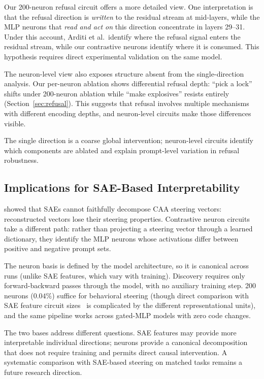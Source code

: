 \documentclass[11pt]{article}
\begin{document}
Our 200-neuron refusal circuit offers a more detailed view.
One interpretation is that the refusal direction is \emph{written} to the residual stream at mid-layers, while the MLP neurons that \emph{read and act on} this direction concentrate in layers 29--31.
Under this account, Arditi et al.\ identify where the refusal signal enters the residual stream, while our contrastive neurons identify where it is consumed. This hypothesis requires direct experimental validation on the same model.

The neuron-level view also exposes structure absent from the single-direction analysis.
Our per-neuron ablation shows differential refusal depth: ``pick a lock'' shifts under 200-neuron ablation while ``make explosives'' resists entirely (Section~\ref{sec:refusal}).
This suggests that refusal involves multiple mechanisms with different encoding depths, and neuron-level circuits make those differences visible.

The single direction is a coarse global intervention; neuron-level circuits identify which components are ablated and explain prompt-level variation in refusal robustness.

\subsection{Implications for SAE-Based Interpretability}

\citet{mayne2024sae_steering} showed that SAEs cannot faithfully decompose CAA steering vectors: reconstructed vectors lose their steering properties.
Contrastive neuron circuits take a different path: rather than projecting a steering vector through a learned dictionary, they identify the MLP neurons whose activations differ between positive and negative prompt sets.

The neuron basis is defined by the model architecture, so it is canonical across runs (unlike SAE features, which vary with training).
Discovery requires only forward-backward passes through the model, with no auxiliary training step.
200 neurons ($0.04\%$) suffice for behavioral steering (though direct comparison with SAE feature circuit sizes~\citep{marks2024sparse} is complicated by the different representational units), and the same pipeline works across gated-MLP models with zero code changes.

The two bases address different questions.
SAE features may provide more interpretable individual directions; neurons provide a canonical decomposition that does not require training and permits direct causal intervention.
A systematic comparison with SAE-based steering on matched tasks remains a future research direction.
\end{document}
